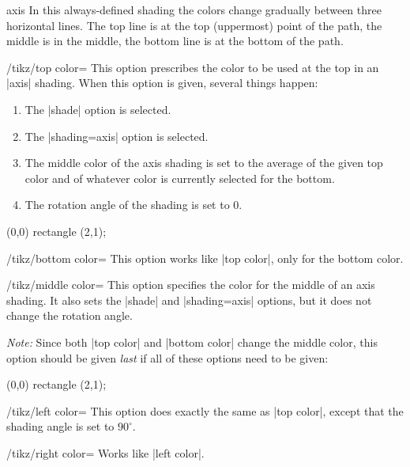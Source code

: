 \begin{shading}{axis}
  In this always-defined shading the colors change gradually
  between three horizontal lines. The top line is at the top
  (uppermost) point of the path, the middle is in the middle, the
  bottom line is at the bottom of the path.

  \begin{key}{/tikz/top color=}
    This option prescribes the color to be used at the top in an |axis|
    shading. When this option is given, several things happen:
    \begin{enumerate}
    \item
      The |shade| option is selected.
    \item
      The |shading=axis| option is selected.
    \item
      The middle color of the axis shading is set to the average of the
      given top color  and of whatever color is currently
      selected for the bottom.
    \item
      The rotation angle of the shading is set to 0.
  \end{enumerate}

\begin{codeexample}[]
\tikz \draw[top color=red] (0,0) rectangle (2,1);
\end{codeexample}
  \end{key}

  \begin{key}{/tikz/bottom color=}
    This option works like |top color|, only for the bottom color.
  \end{key}

  \begin{key}{/tikz/middle color=}
    This option specifies the color for the middle of an axis
    shading. It also sets the |shade| and |shading=axis| options, but it
    does not change the rotation angle.

    \emph{Note:} Since both |top color| and |bottom color| change the
    middle color, this option should be given \emph{last} if all of
    these options need to be given:

\begin{codeexample}[]
\tikz \draw[top color=white,bottom color=black,middle color=red]
  (0,0) rectangle (2,1);
\end{codeexample}
  \end{key}

  \begin{key}{/tikz/left color=}
    This option does exactly the same as |top color|, except that the
    shading angle is set to $90^\circ$.
  \end{key}

  \begin{key}{/tikz/right color=}
    Works like |left color|.
  \end{key}
\end{shading}


